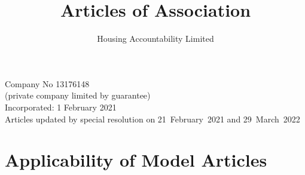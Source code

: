\documentclass[10pt]{mk-articles-of-association}
\newcommand{\Name}[0]{Housing Accountability Limited}
\begin{document}
\title{
Articles of Association\\
}
\author{\Name{}\\
}
\date{}

\maketitle

\begin{center}
Company No 13176148\\
(private company limited by guarantee)\\
\medskip
Incorporated: 1 February 2021 \\
\medskip
Articles updated by special resolution on 21~February~2021 and 29~March~2022
\end{center}



\section{Applicability of Model Articles}
\end{document}
